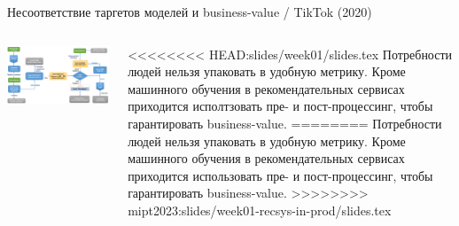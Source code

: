 \documentclass[11pt,aspectratio=169,handout]{beamer}
\begin{document}
\begin{frame}{Несоответствие таргетов моделей и business-value / TikTok (2020) \cite{TIK}}
\begin{columns}
\begin{column}{0.6\textwidth}
   \begin{center}
		\includegraphics[scale=0.24]{images/tiktok.png}
   \end{center}
\end{column}
\begin{column}{0.35\textwidth}
    \begin{small}
    \begin{tcolorbox}[colback=info!5,colframe=info!80,title=]
<<<<<<<< HEAD:slides/week01/slides.tex
    Потребности людей нельзя упаковать в удобную метрику. Кроме машинного обучения  в рекомендательных сервисах приходится исполтзовать пре- и пост-процессинг, чтобы гарантировать business-value.
========
    Потребности людей нельзя упаковать в удобную метрику. Кроме машинного обучения  в рекомендательных сервисах приходится использовать пре- и пост-процессинг, чтобы гарантировать business-value.
>>>>>>>> mipt2023:slides/week01-recsys-in-prod/slides.tex
    \end{tcolorbox}
    \end{small}
\end{column}
\end{columns}

\end{frame}
\end{document}
